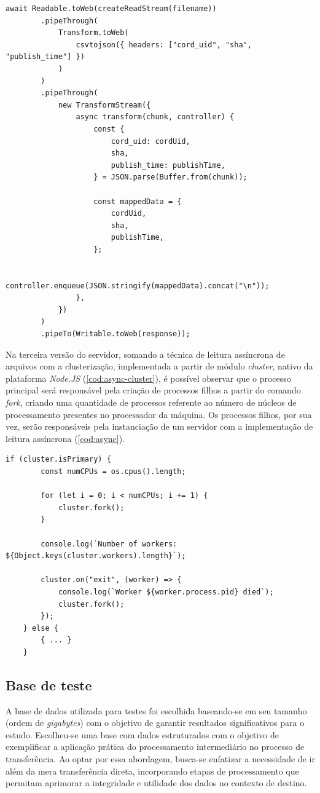 \documentclass[12pt]{article}
\begin{document}
\begin{lstlisting}[caption={Implementação da leitura do arquivo de forma assíncrona}, label=cod:async]
	await Readable.toWeb(createReadStream(filename))
		.pipeThrough(
			Transform.toWeb(
				csvtojson({ headers: ["cord_uid", "sha", "publish_time"] })
			)
		)
		.pipeThrough(
			new TransformStream({
				async transform(chunk, controller) {
					const {
						cord_uid: cordUid,
						sha,
						publish_time: publishTime,
					} = JSON.parse(Buffer.from(chunk));

					const mappedData = {
						cordUid,
						sha,
						publishTime,
					};

					controller.enqueue(JSON.stringify(mappedData).concat("\n"));
				},
			})
		)
		.pipeTo(Writable.toWeb(response));
\end{lstlisting}

Na terceira versão do servidor, somando a técnica de leitura
assíncrona de arquivos com a clusterização, implementada a partir de módulo \textit{cluster}, nativo da plataforma
\textit{Node.JS} (\autoref{cod:async-cluster}), é possível observar que o processo principal será responsável pela criação de processos filhos a partir
do comando \textit{fork}, criando uma quantidade de processos referente ao número de núcleos de processamento presentes
no processador da máquina. Os processos filhos, por sua vez, serão responsáveis pela instanciação de um servidor com 
a implementação de leitura assíncrona (\autoref{cod:async}).

\begin{lstlisting}[caption={Implementação da técnica de clusterização}, label=cod:async-cluster]
	if (cluster.isPrimary) {
		const numCPUs = os.cpus().length;

		for (let i = 0; i < numCPUs; i += 1) {
			cluster.fork();
		}

		console.log(`Number of workers: ${Object.keys(cluster.workers).length}`);

		cluster.on("exit", (worker) => {
			console.log(`Worker ${worker.process.pid} died`);
			cluster.fork();
		});
	} else {
		{ ... }
	}
\end{lstlisting}


\subsection{Base de teste}

A base de dados utilizada para testes foi escolhida baseando-se em seu tamanho (ordem de \textit{gigabytes}) com
o objetivo de garantir resultados significativos para o estudo. Escolheu-se uma base com dados estruturados com o 
objetivo de exemplificar a aplicação prática do processamento intermediário no processo de transferência. 
Ao optar por essa abordagem, busca-se enfatizar a necessidade de ir além da mera transferência direta, 
incorporando etapas de processamento que permitam aprimorar a integridade e utilidade dos dados no contexto de destino.
\end{document}
